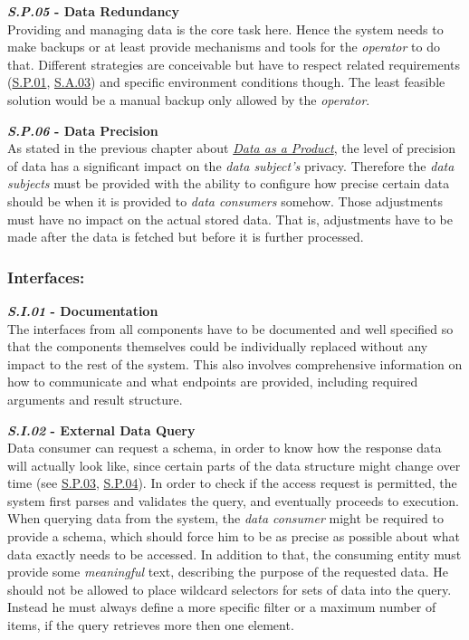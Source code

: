 \documentclass[12pt,english,a4paper,titlepage,cleardoublepage=empty,dottedtoc]{report}
\begin{document}
\textbf{\emph{\protect\hypertarget{sp05}{}{S.P.05}} - Data Redundancy}\\
Providing and managing data is the core task here. Hence the system
needs to make backups or at least provide mechanisms and tools for the
\emph{operator} to do that. Different strategies are conceivable but
have to respect related requirements (\protect\hyperlink{sp01}{S.P.01},
\protect\hyperlink{sa03}{S.A.03}) and specific environment conditions
though. The least feasible solution would be a manual backup only
allowed by the \emph{operator}.

\textbf{\emph{\protect\hypertarget{sp06}{}{S.P.06}} - Data Precision}\\
As stated in the previous chapter about
\emph{\protect\hyperlink{personal-data-as-a-product}{Data as a
Product}}, the level of precision of data has a significant impact on
the \emph{data subject's} privacy. Therefore the \emph{data subjects}
must be provided with the ability to configure how precise certain data
should be when it is provided to \emph{data consumers} somehow. Those
adjustments must have no impact on the actual stored data. That is,
adjustments have to be made after the data is fetched but before it is
further processed.

\subsubsection{Interfaces:}\label{interfaces}

\textbf{\emph{\protect\hypertarget{si01}{}{S.I.01}} - Documentation}\\
The interfaces from all components have to be documented and well
specified so that the components themselves could be individually
replaced without any impact to the rest of the system. This also
involves comprehensive information on how to communicate and what
endpoints are provided, including required arguments and result
structure.

\textbf{\emph{\protect\hypertarget{si02}{}{S.I.02}} - External Data
Query}\\
Data consumer can request a schema, in order to know how the response
data will actually look like, since certain parts of the data structure
might change over time (see \protect\hyperlink{sp03}{S.P.03},
\protect\hyperlink{sp04}{S.P.04}). In order to check if the access
request is permitted, the system first parses and validates the query,
and eventually proceeds to execution. When querying data from the
system, the \emph{data consumer} might be required to provide a schema,
which should force him to be as precise as possible about what data
exactly needs to be accessed. In addition to that, the consuming entity
must provide some \emph{meaningful} text, describing the purpose of the
requested data. He should not be allowed to place wildcard selectors for
sets of data into the query. Instead he must always define a more
specific filter or a maximum number of items, if the query retrieves
more then one element.
\end{document}
